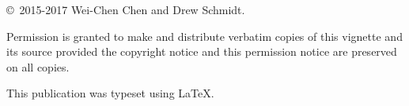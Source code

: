 
\null
\vfill
\copyright\ 2015-2017 Wei-Chen Chen and Drew Schmidt.

Permission is granted to make and distribute verbatim copies of
this vignette and its source provided the copyright notice and
this permission notice are preserved on all copies.

This publication was typeset using \LaTeX.
